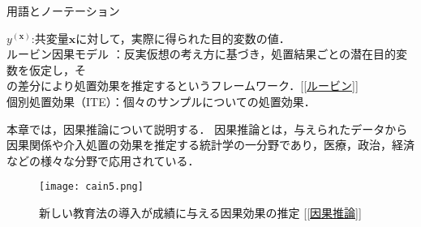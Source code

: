 \documentclass[dvipdfmx]{jreport}
\begin{document}
\begin{itembox}[l]{\large{用語とノーテーション}}
\begin{tabbing}
        \hspace{15pt} \raisebox{0.5ex}{\tiny $\bullet$} $y^{(\boldsymbol{x})}$\>:共変量$\boldsymbol{x}$に対して，実際に得られた目的変数の値．\\[0.5em] 
        \hspace{15pt} \raisebox{0.5ex}{\tiny $\bullet$} ルービン因果モデル \>：反実仮想の考え方に基づき，処置結果ごとの潜在目的変数を仮定し，そ\\[0.5em]\>\hspace{6.5pt}の差分により処置効果を推定するというフレームワーク．[\ref{ルービン}]\\[0.5em]
        \hspace{15pt} \raisebox{0.5ex}{\tiny $\bullet$} 個別処置効果（ITE）\>：個々のサンプルについての処置効果．
    \end{tabbing}
\end{itembox}

本章では，因果推論について説明する．
因果推論とは，与えられたデータから因果関係や介入処置の効果を推定する統計学の一分野であり，医療，政治，経済などの様々な分野で応用されている．

\begin{figure}[h]
    \begin{center}
        \texttt{[image: cain5.png]}
    \end{center}
    \caption{新しい教育法の導入が成績に与える因果効果の推定 [\ref{因果推論}]} \label{fig:因果推論}
\end{figure}
\end{document}
